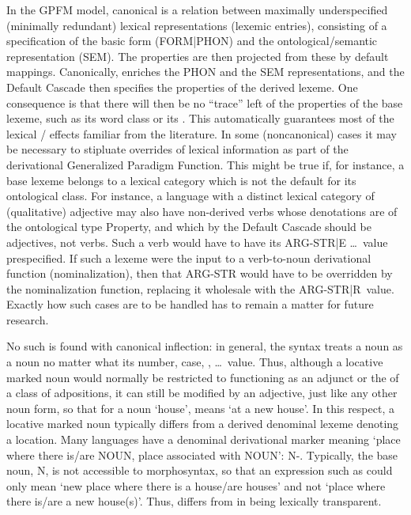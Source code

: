 \documentclass[output=paper,
modfonts
]{LSP/langsci}
\begin{document}
\newpage 
In the GPFM model, canonical  is a relation between maximally underspecified (minimally redundant) lexical representations (lexemic entries), consisting of a specification of the basic  form (FORM|PHON) and the ontological/semantic representation (SEM). The  properties are then projected from these by default mappings. Canonically,  enriches the PHON and the SEM representations, and the Default Cascade then specifies the  properties of the derived lexeme. One consequence is that there will then be no ``trace'' left of the  properties of the base lexeme, such as its word class or its . This automatically guarantees most of the lexical / effects familiar from the literature. In some (noncanonical) cases it may be necessary to stipluate overrides of lexical information as part of the derivational Generalized Paradigm Function. This might be true if, for instance, a base lexeme belongs to a lexical category which is not the default for its ontological class. For instance, a language with a distinct lexical category of (qualitative) adjective may also have non-derived  verbs whose denotations are of the ontological type Property, and which by the Default Cascade should be adjectives, not verbs. Such a verb would have to have its ARG-STR|\lab E \ldots \rab\ value prespecified.  If such a lexeme were the input to a verb-to-noun derivational function (nominalization), then that ARG-STR would have to be overridden by the nominalization function, replacing it wholesale with the ARG-STR|\lab R\rab\ value. Exactly how such cases are to be handled has to remain a matter for future research.


No such  is found with canonical inflection: in general, the syntax treats a noun as a noun no matter what its number, case, , \ldots\ value. Thus, although a locative  marked noun would normally be restricted to functioning as an adjunct or the  of a class of adpositions, it can still be modified by an adjective, just like any other noun form, so that for a noun ‘house’,  means ‘at a new house’. In this respect, a locative  marked noun typically differs from a  derived denominal lexeme denoting a location. Many languages have a denominal derivational marker meaning ‘place where there is/are NOUN, place associated with NOUN’: N-. Typically, the base noun, N, is not accessible to morphosyntax, so that  an expression such as  could only mean ‘new place where there is a house/are houses’ and not ‘place where there is/are a new house(s)’.  Thus,  differs from  in being lexically transparent. 
\end{document}
